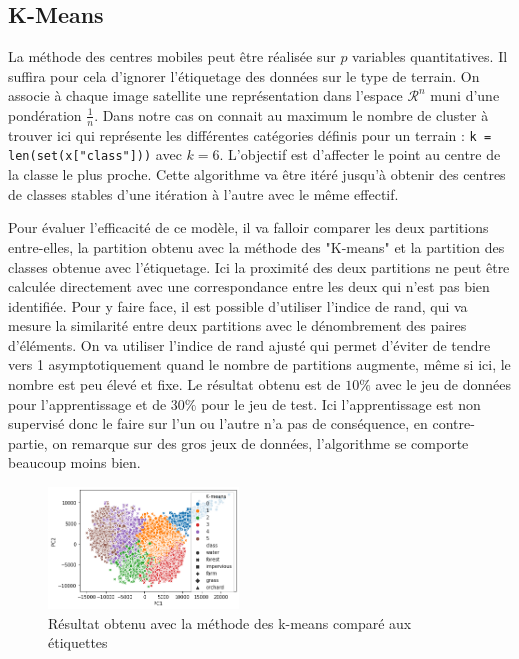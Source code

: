 \documentclass[twocolumn,10pt]{article}
\def\pycode#1{\texttt{#1}}
\begin{document}
\subsection{K-Means}
La méthode des centres mobiles peut être réalisée sur $p$ variables quantitatives. Il suffira pour cela d'ignorer l'étiquetage des données sur le type de terrain. On associe à chaque image satellite une représentation dans l'espace $\mathcal{R}^n$ muni d'une pondération $\frac{1}{n}$. Dans notre cas on connait au maximum le nombre de cluster à trouver ici qui représente les différentes catégories définis pour un terrain : \pycode{k = len(set(x["class"]))} avec $k=6$. 
L'objectif est d'affecter le point au centre de la classe le plus proche. Cette algorithme va être itéré jusqu'à obtenir des centres de classes stables d'une itération à l'autre avec le même effectif. 

Pour évaluer l'efficacité de ce modèle, il va falloir comparer les deux partitions entre-elles, la partition obtenu avec la méthode des "K-means" et la partition des classes obtenue avec l'étiquetage. Ici la proximité des deux partitions ne peut être calculée directement avec une correspondance entre les deux qui n'est pas bien identifiée. Pour y faire face, il est possible d'utiliser l'indice de rand, qui va mesure la similarité entre deux partitions avec le dénombrement des paires d'éléments. On va utiliser l'indice de rand ajusté qui permet d'éviter de tendre vers 1 asymptotiquement quand le nombre de partitions augmente, même si ici, le nombre est peu élevé et fixe. Le résultat obtenu est de $10\%$ avec le jeu de données pour l'apprentissage et de $30\%$ pour le jeu de test. Ici l'apprentissage est non supervisé donc le faire sur l'un ou l'autre n'a pas de conséquence, en contre-partie, on remarque sur des gros jeux de données, l'algorithme se comporte beaucoup moins bien. 

\begin{figure}[htbp]
\begin{center}
\includegraphics[width=0.45\textwidth]{figures/k-means.png}
\caption{\label{fig:k-means}Résultat obtenu avec la méthode des k-means comparé aux étiquettes}
\end{center}
\end{figure}
\end{document}

